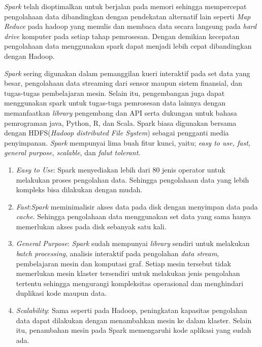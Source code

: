\documentclass[a4paper,twoside]{article}
\begin{document}
\begin{enumerate}
{		\textit{Spark} telah dioptimalkan untuk berjalan pada memori sehingga mempercepat 						pengolahaan data dibandingkan dengan pendekatan alternatif lain seperti \textit{Map Reduce} 			pada hadoop yang menulis dan membaca data secara langsung pada \textit{hard drive} komputer 			pada setiap tahap pemrosesan. Dengan demikian kecepatan pengolahaan data menggunakan spark 				dapat menjadi lebih cepat dibandingkan dengan Hadoop. 

		\textit{Spark} sering digunakan dalam pemanggilan kueri interaktif pada set data yang besar, 		pengolahaan data streaming dari sensor maupun sistem finansial, dan tugas-tugas pembelajaran 		mesin. Selain itu, pengembangan juga dapat menggunakan spark untuk tugas-tuga pemrosesan 				data lainnya dengan memanfaatkan \textit{library} pengembang dan API serta dukungan untuk 				bahasa pemrograman java, Python, R, dan Scala. Spark biasa digunakan bersama dengan 					HDFS(\textit{Hadoop distributed File System}) sebagai pengganti media penyimpanan. 						\textit{Spark} mempunyai lima buah fitur kunci, yaitu; \textit{easy to use, fast, general 				purpose, scalable}, dan \textit{falut tolerant}.
		
		\begin{enumerate}
			\item{\textit{Easy to Use}: Spark menyediakan lebih dari 80 jenis operator untuk 						melakukan proses pengolahan data. Sehingga pengolahaan data yang lebih kompleks bisa 					dilakukan dengan mudah.}
	
			\item{\textit{Fast}:\textit{Spark} meminimalisir akses data pada disk dengan menyimpan 					data pada \textit{cache}. Sehingga pengolahaan data menggunakan set data yang sama hanya 			memerlukan akses pada disk sebanyak satu kali.}
	
			\item{\textit{General Purpose}: \textit{Spark} sudah mempunyai \textit{library} sendiri 				untuk melakukan \textit{batch processing}, analisis interaktif pada pengolahan 							\textit{data stream}, pembelajaran mesin dan komputasi graf. Setiap mesin tersebut tidak 			memerlukan mesin klaster tersendiri untuk melakukan jenis pengolahan tertentu sehingga 					mengurangi kompleksitas operasional dan menghindari duplikasi kode maupun data.}
	
			\item{\textit{Scalability}: Sama seperti pada Hadoop, peningkatan kapasitas pengolahan 					data dapat dilakukan dengan menambahkan mesin ke dalam klaster. Selain itu, penambahan 					mesin pada Spark memengaruhi kode aplikasi yang sudah ada.}
	

\end{enumerate}}
\end{enumerate}
\end{document}
